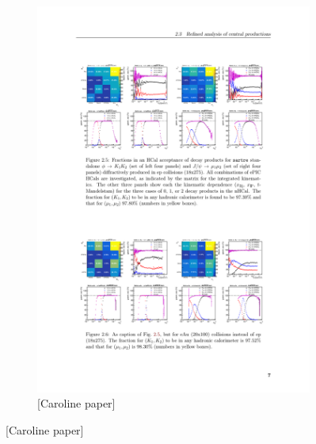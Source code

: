 \begin{figure}[H]
\begin{subfigure}{.48\linewidth}
        \includegraphics[width=\linewidth]{img/K1K2matica.pdf}
        \caption{[Caroline paper]}
        \label{fig:nhcal:K1K2matica}
    \end{subfigure}
\end{figure}
